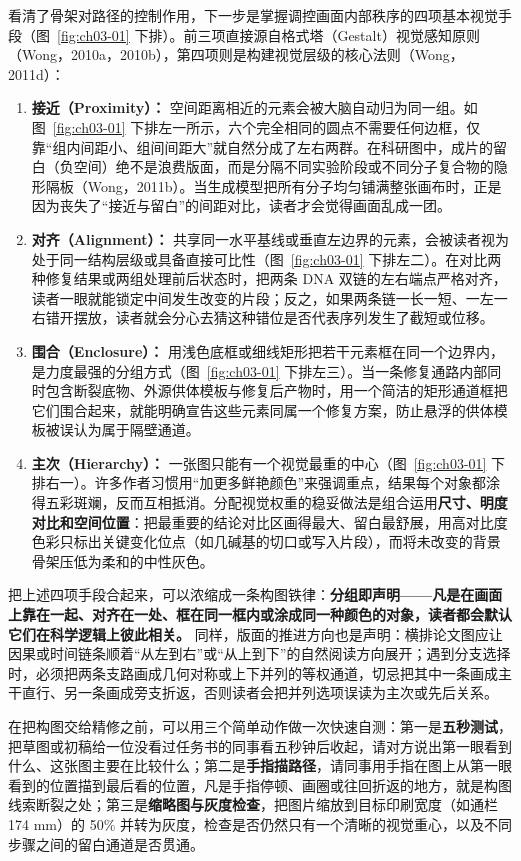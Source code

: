 看清了骨架对路径的控制作用，下一步是掌握调控画面内部秩序的四项基本视觉手段（图~\ref{fig:ch03-01} 下排）。前三项直接源自格式塔（Gestalt）视觉感知原则（Wong，2010a，2010b），第四项则是构建视觉层级的核心法则（Wong，2011d）：

\begin{enumerate}
\item \textbf{接近（Proximity）：} 空间距离相近的元素会被大脑自动归为同一组。如图~\ref{fig:ch03-01} 下排左一所示，六个完全相同的圆点不需要任何边框，仅靠“组内间距小、组间间距大”就自然分成了左右两群。在科研图中，成片的留白（负空间）绝不是浪费版面，而是分隔不同实验阶段或不同分子复合物的隐形隔板（Wong，2011b）。当生成模型把所有分子均匀铺满整张画布时，正是因为丧失了“接近与留白”的间距对比，读者才会觉得画面乱成一团。
\item \textbf{对齐（Alignment）：} 共享同一水平基线或垂直左边界的元素，会被读者视为处于同一结构层级或具备直接可比性（图~\ref{fig:ch03-01} 下排左二）。在对比两种修复结果或两组处理前后状态时，把两条 DNA 双链的左右端点严格对齐，读者一眼就能锁定中间发生改变的片段；反之，如果两条链一长一短、一左一右错开摆放，读者就会分心去猜这种错位是否代表序列发生了截短或位移。
\item \textbf{围合（Enclosure）：} 用浅色底框或细线矩形把若干元素框在同一个边界内，是力度最强的分组方式（图~\ref{fig:ch03-01} 下排左三）。当一条修复通路内部同时包含断裂底物、外源供体模板与修复后产物时，用一个简洁的矩形通道框把它们围合起来，就能明确宣告这些元素同属一个修复方案，防止悬浮的供体模板被误认为属于隔壁通道。
\item \textbf{主次（Hierarchy）：} 一张图只能有一个视觉最重的中心（图~\ref{fig:ch03-01} 下排右一）。许多作者习惯用“加更多鲜艳颜色”来强调重点，结果每个对象都涂得五彩斑斓，反而互相抵消。分配视觉权重的稳妥做法是组合运用\textbf{尺寸、明度对比和空间位置}：把最重要的结论对比区画得最大、留白最舒展，用高对比度色彩只标出关键变化位点（如几碱基的切口或写入片段），而将未改变的背景骨架压低为柔和的中性灰色。
\end{enumerate}

把上述四项手段合起来，可以浓缩成一条构图铁律：\textbf{分组即声明——凡是在画面上靠在一起、对齐在一处、框在同一框内或涂成同一种颜色的对象，读者都会默认它们在科学逻辑上彼此相关。} 同样，版面的推进方向也是声明：横排论文图应让因果或时间链条顺着“从左到右”或“从上到下”的自然阅读方向展开；遇到分支选择时，必须把两条支路画成几何对称或上下并列的等权通道，切忌把其中一条画成主干直行、另一条画成旁支折返，否则读者会把并列选项误读为主次或先后关系。

在把构图交给精修之前，可以用三个简单动作做一次快速自测：第一是\textbf{五秒测试}，把草图或初稿给一位没看过任务书的同事看五秒钟后收起，请对方说出第一眼看到什么、这张图主要在比较什么；第二是\textbf{手指描路径}，请同事用手指在图上从第一眼看到的位置描到最后看的位置，凡是手指停顿、画圈或往回折返的地方，就是构图线索断裂之处；第三是\textbf{缩略图与灰度检查}，把图片缩放到目标印刷宽度（如通栏 174 mm）的 50\% 并转为灰度，检查是否仍然只有一个清晰的视觉重心，以及不同步骤之间的留白通道是否贯通。


